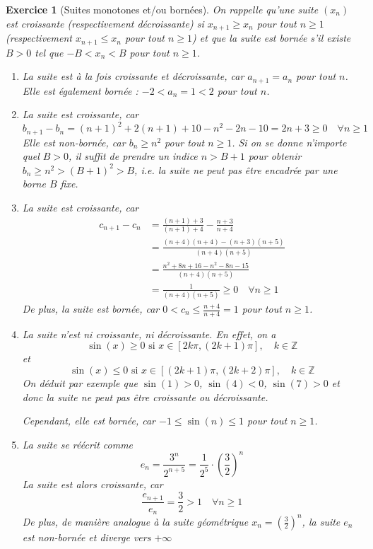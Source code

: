 \documentclass[11.5pt,french,table]{article}
\theoremstyle{exercice}
\newtheorem{exercice}{Exercice}
\begin{document}
\begin{exercice}[Suites monotones et/ou bornées]
On rappelle qu'une suite $(x_n)$ est croissante (respectivement décroissante) si $x_{n+1} \geq x_n$ pour tout $n \geq 1$ (respectivement $x_{n+1} \leq x_n$ pour tout $n \geq 1$) et que la suite est bornée s'il existe $B > 0$ tel que $- B < x_n < B$ pour tout $n \geq 1$.
\begin{enumerate}
    \item La suite est à la fois croissante et décroissante, car $a_{n+1} = a_n$ pour tout $n$. Elle est également bornée : $-2 < a_n = 1 < 2$ pour tout $n$.
    
    \item La suite est croissante, car $$b_{n+1}-b_n = (n+1)^2 + 2(n+1) + 10 - n^2 - 2n - 10 = 2n + 3 \geq 0 \quad \forall n \geq 1$$
    Elle est non-bornée, car $b_n \geq n^2$ pour tout $n \geq 1$. Si on se donne n'importe quel $B > 0$, il suffit de prendre un indice $n > B+1$ pour obtenir $b_n \geq n^2 > (B+1)^2 > B$, i.e. la suite ne peut pas être encadrée par une borne $B$ fixe.
    
    \item La suite est croissante, car
    \begin{align*}
        c_{n+1}-c_n &= \frac{(n+1)+3}{(n+1)+4} - \frac{n+3}{n+4} \\
        &= \frac{(n+4)(n+4) - (n+3)(n+5)}{(n+4)(n+5)} \\
        &= \frac{n^2 + 8n + 16 - n^2 - 8n - 15}{(n+4)(n+5)} \\
        &= \frac{1}{(n+4)(n+5)} \geq 0 \quad \forall n \geq 1
    \end{align*}
    De plus, la suite est bornée, car $\displaystyle 0 < c_n \leq \frac{n+4}{n+4} = 1$ pour tout $n \geq 1$.
    
    \item La suite n'est ni croissante, ni décroissante. En effet, on a 
    $$\sin(x) \geq 0 \text{ si } x \in [2k \pi, (2k + 1)\pi], \quad k \in \mathbb{Z}$$
    et 
    $$\sin(x) \leq 0 \text{ si } x \in [(2k+1) \pi, (2k+2)\pi], \quad k \in \mathbb{Z}$$
    On déduit par exemple que $\sin(1) > 0$, $\sin(4) < 0$, $\sin(7) > 0$ et donc la suite ne peut pas être croissante ou décroissante.
    
    Cependant, elle est bornée, car $-1 \leq \sin(n) \leq 1$ pour tout $n \geq 1$.
    
    \item La suite se réécrit comme 
    $$e_n = \frac{3^n}{2^{n+5}} = \frac{1}{2^5} \cdot \left( \frac{3}{2} \right)^n$$
    La suite est alors croissante, car
    $$\frac{e_{n+1}}{e_n} = \frac{3}{2} > 1 \quad \forall n \geq 1$$
    De plus, de manière analogue à la suite géométrique $\displaystyle x_n = \left( \frac{3}{2} \right)^n$, la suite $e_n$ est non-bornée et diverge vers $+\infty$
    

\end{enumerate}
\end{exercice}
\end{document}
